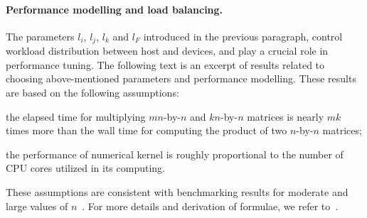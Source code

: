 \documentclass{llncs}
\begin{document}


\paragraph{Performance modelling and load balancing.} \label{sec:load_balancing_parameters}

The parameters $l_i$, $l_j$, $l_k$ and $l_F$ 
introduced in the previous paragraph,
control workload distribution between host and devices, 
and play a crucial role in performance tuning.
The following text is an excerpt of results related to 
choosing above-mentioned parameters and performance modelling.
These results are based on the following assumptions: 
\begin{inparaenum}[(i)]
\item the elapsed time for 
  multiplying $mn$-by-$n$ and $kn$-by-$n$ matrices
  is nearly $mk$ times more than the wall time for computing the product
  of two $n$-by-$n$ matrices;
\item the performance of numerical kernel
  is roughly proportional to the number of CPU cores utilized in its computing.
\end{inparaenum}
These assumptions are consistent with benchmarking results 
for moderate and large values of $n$~\cite{GogolenkoBai13}.
For more details and derivation of formulae, we refer to~\cite{GogolenkoBai13}.
\end{document}
